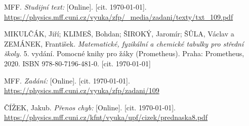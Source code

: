 
\begin{thebibliography}{9}
 MFF. \emph{Studijní text:} [Online]. [cit. \today]. \newline \url{https://physics.mff.cuni.cz/vyuka/zfp/_media/zadani/texty/txt_109.pdf}

 MIKULČÁK, Jiří; KLIMEŠ, Bohdan; ŠIROKÝ, Jaromír; ŠŮLA, Václav a ZEMÁNEK, František. \emph{Matematické, fyzikální a chemické tabulky pro střední školy.} 5. vydání. Pomocné knihy pro žáky (Prometheus). Praha: Prometheus, 2020. ISBN 978-80-7196-481-0. [cit. \today]

 MFF. \emph{Zadání:} [Online]. [cit. \today]. \newline \url{https://physics.mff.cuni.cz/vyuka/zfp/zadani/109}

 ČÍŽEK, Jakub. \emph{Přenos chyb:} [Online]. [cit. \today]. \newline \url{https://physics.mff.cuni.cz/kfnt/vyuka/upf/cizek/prednaska8.pdf}

\end{thebibliography}
